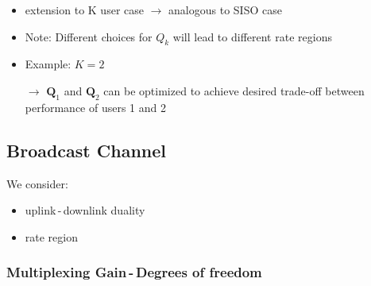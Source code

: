 \documentclass[a4paper, 10pt]{article}
\begin{document}
\begin{itemize}
	\item extension to K user case $\rightarrow $ analogous to SISO case
	\item Note: Different choices for $Q_k $ will lead to different rate regions
	\item Example: $ K = 2$
	\item[$\rightarrow$] $\mathbf{Q}_1 $ and $ \mathbf{Q}_2 $ can be optimized to achieve desired trade-off between  performance of users 1 and 2
\end{itemize}

\subsection{Broadcast Channel}
We consider:
\begin{itemize}
	\item uplink\,-\,downlink duality
	\item rate region
\end{itemize}
\subsubsection{Multiplexing Gain\,-\,Degrees of freedom}
\end{document}
